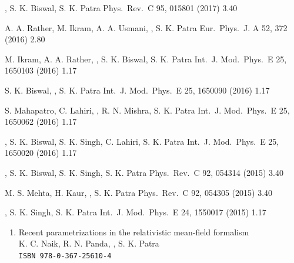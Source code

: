\begin{enumerate}
{\me, S. K. Biswal, S. K. Patra}
{Phys.\ Rev.\ C 95, 015801 (2017)}
{\pipe {}}{3.40}

{A. A. Rather, M. Ikram, A. A. Usmani, \me, S. K. Patra}
{Eur.\ Phys.\ J. A 52, 372 (2016)}
{\pipe {}}{2.80}

{M. Ikram, A. A. Rather, \me, S. K. Biswal, S. K. Patra}
{Int.\ J. Mod.\ Phys.\ E 25, 1650103 (2016)}
{\pipe {}}{1.17}

{S. K. Biswal, \me, S. K. Patra}
{Int.\ J. Mod.\ Phys.\ E 25, 1650090 (2016)}
{\pipe {}}{1.17}

{S. Mahapatro, C. Lahiri, \me, R. N. Mishra, S. K. Patra}
{Int.\ J. Mod.\ Phys.\ E 25, 1650062 (2016)}
{\pipe {}}{1.17}

{\me, S. K. Biswal, S. K. Singh, C. Lahiri, S. K. Patra}
{Int.\ J. Mod.\ Phys.\ E 25, 1650020 (2016)}
{}{1.17}

{\me, S. K. Biswal, S. K. Singh, S. K. Patra}
{Phys.\ Rev.\ C 92, 054314 (2015)}
{\pipe {}}{3.40}

{M. S. Mehta, H. Kaur, \me, S. K. Patra}
{Phys.\ Rev.\ C 92, 054305 (2015)}
{\pipe {}}{3.40}

{\me, S. K. Singh, S. K. Patra}
{Int.\ J. Mod.\ Phys.\ E 24, 1550017 (2015)}
{\pipe {}}{1.17}

\end{enumerate}

\begin{enumerate}
\item Recent parametrizations in the relativistic mean-field formalism\\
K. C. Naik, R. N. Panda, \me, S. K. Patra\\
\quad
\texttt{\small ISBN 978-0-367-25610-4}
\end{enumerate}

